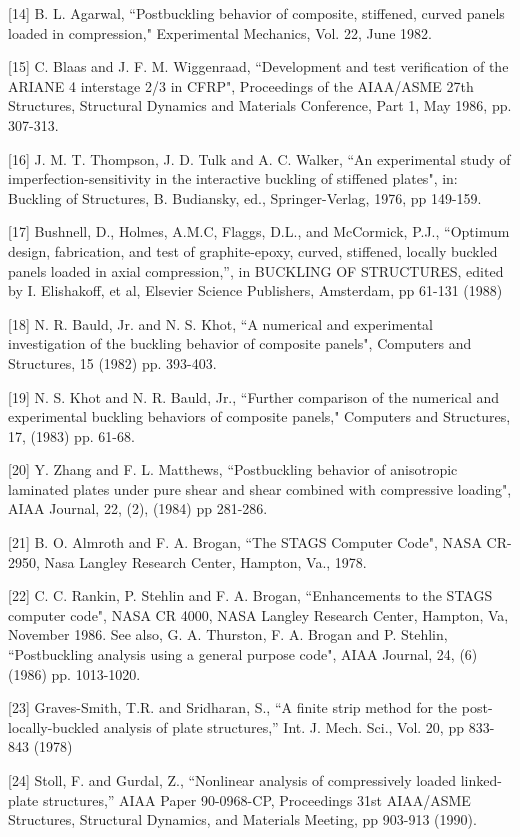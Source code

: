 [14] B. L. Agarwal, ``Postbuckling behavior of composite, stiffened,
curved panels loaded in compression," Experimental Mechanics, Vol.
22, June 1982. 

[15] C. Blaas and J. F. M. Wiggenraad, ``Development and test
verification of the ARIANE 4 interstage 2/3 in CFRP", Proceedings of
the AIAA/ASME 27th Structures, Structural Dynamics and Materials
Conference, Part 1, May 1986, pp. 307-313. 

[16] J. M. T. Thompson, J. D. Tulk and A. C. Walker, ``An
experimental study of imperfection-sensitivity in the interactive
buckling of stiffened plates", in:  Buckling of Structures, B.
Budiansky, ed., Springer-Verlag, 1976, pp 149-159. 

[17] Bushnell, D., Holmes, A.M.C, Flaggs, D.L., and McCormick, P.J.,
``Optimum design, fabrication, and test of graphite-epoxy, curved,
stiffened, locally buckled panels loaded in axial compression,'',
in BUCKLING OF STRUCTURES, edited by I. Elishakoff, et al, Elsevier
Science Publishers, Amsterdam, pp 61-131 (1988)

[18] N. R. Bauld, Jr. and N. S. Khot, ``A numerical and experimental
investigation of the buckling behavior of composite panels",
Computers and Structures, 15 (1982) pp. 393-403. 

[19] N. S. Khot and N. R. Bauld, Jr., ``Further comparison of the
numerical and experimental buckling behaviors of composite panels,"
Computers and Structures, 17, (1983) pp. 61-68. 

[20] Y. Zhang and F. L. Matthews, ``Postbuckling behavior of
anisotropic laminated plates under pure shear and shear combined with
compressive loading", AIAA Journal, 22, (2), (1984) pp 281-286. 

[21] B. O. Almroth and F. A. Brogan, ``The STAGS Computer Code", NASA
CR-2950, Nasa Langley Research Center, Hampton, Va., 1978. 

[22] C. C. Rankin, P. Stehlin and F. A. Brogan, ``Enhancements to the
STAGS computer code", NASA CR 4000, NASA Langley Research Center,
Hampton, Va, November 1986. See also, G. A. Thurston, F. A. Brogan
and P. Stehlin, ``Postbuckling analysis using a general purpose
code", AIAA Journal, 24, (6) (1986) pp. 1013-1020. 

[23] Graves-Smith, T.R. and Sridharan, S., ``A finite strip method
for the post-locally-buckled analysis of plate structures,'' Int.
J. Mech. Sci., Vol. 20, pp 833-843 (1978)

[24] Stoll, F. and Gurdal, Z., ``Nonlinear analysis of compressively
loaded linked-plate structures,'' AIAA Paper 90-0968-CP,
Proceedings 31st AIAA/ASME Structures, Structural Dynamics,
and Materials Meeting, pp 903-913 (1990).

